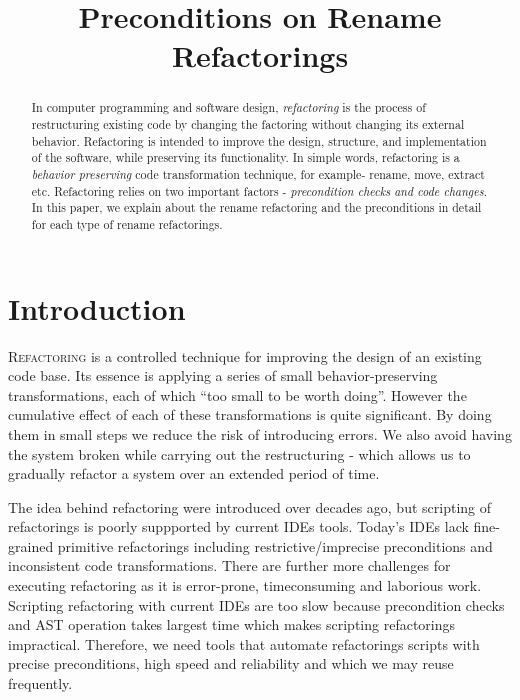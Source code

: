 \documentclass[10pt,conference]{IEEEtran}
\begin{document}
\title{Preconditions on Rename Refactorings}

\author{
\and
{}
\and
{}
}

\maketitle

\begin{abstract}
In computer programming and software design, \emph{refactoring} is the process of restructuring existing code by changing the factoring without changing its external behavior. Refactoring is intended to improve the design, structure, and implementation of the software, while preserving its functionality. In simple words, refactoring is a \emph{behavior preserving} code transformation technique, for example- rename, move, extract etc. Refactoring relies on two important factors - \emph{precondition checks and code changes}. In this paper, we explain about the rename refactoring and the preconditions in detail for each type of rename refactorings.
\end{abstract}

\section{\textbf{Introduction}}
\lettrine{R}{efactoring} is a controlled technique for improving the design of an existing code base. Its essence is applying a series of small behavior-preserving transformations, each of which ``too small to be worth doing''. However the cumulative effect of each of these transformations is quite significant. By doing them in small steps we reduce the risk of introducing errors. We also avoid having the system broken while carrying out the restructuring - which allows us to gradually refactor a system over an extended period of time.~\cite{Fowler}

The idea behind refactoring were introduced over decades ago, but scripting of refactorings is poorly suppported by current IDEs tools. Today’s IDEs lack fine-grained primitive refactorings including restrictive/imprecise preconditions and inconsistent code transformations. There are further more challenges for executing refactoring as it is error-prone, timeconsuming and laborious work. Scripting refactoring with current IDEs are too slow because precondition checks and AST operation takes largest time which makes scripting refactorings impractical. Therefore, we need tools that automate refactorings scripts with precise preconditions, high speed and reliability and which we may reuse frequently. 
\end{document}
